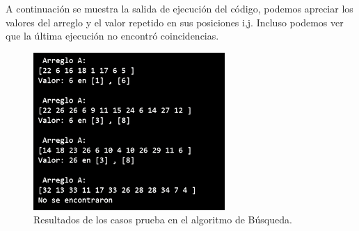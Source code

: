 \documentclass[12pt,twoside]{article}
\begin{document}
A continuación se muestra la salida de ejecuci\'on  del c\'odigo, podemos apreciar los valores del arreglo y el valor repetido en sus posiciones i,j. Incluso podemos ver que la \'ultima ejecución no encontr\'o coincidencias.
\begin{figure}[H]
    \centering
    \includegraphics[height=6cm]{imagenes/salida1.png}
    \caption{Resultados de los casos prueba en el algoritmo de B\'usqueda.}
\end{figure}

    
\end{document}
